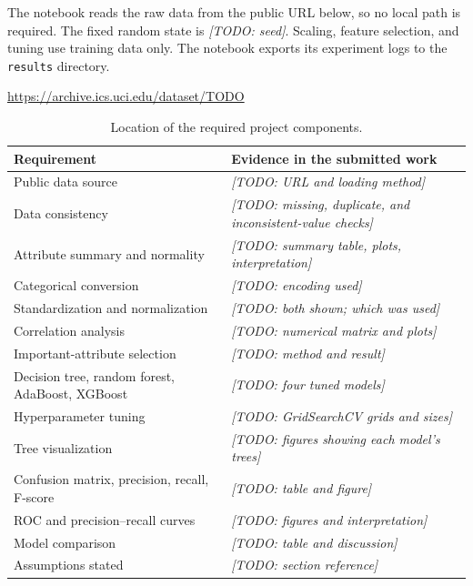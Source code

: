 \documentclass[11pt]{article}
\newcommand{\dataseturl}{https://archive.ics.uci.edu/dataset/TODO}
\DeclareRobustCommand{\todo}[1]{{\color{red}\textit{[TODO: #1]}}}
\begin{document}
The notebook reads the raw data from the public URL below, so no local path is required.
The fixed random state is \todo{seed}. Scaling, feature selection, and tuning use training
data only. The notebook exports its experiment logs to the \texttt{results} directory.

\begin{center}
\small\url{\dataseturl}
\end{center}

\begin{table}[H]
\centering
\caption{Location of the required project components.}
\small
\begin{tabularx}{0.96\textwidth}{lX}
\toprule
Requirement & Evidence in the submitted work \\
\midrule
Public data source & \todo{URL and loading method} \\
Data consistency & \todo{missing, duplicate, and inconsistent-value checks} \\
Attribute summary and normality & \todo{summary table, plots, interpretation} \\
Categorical conversion & \todo{encoding used} \\
Standardization and normalization & \todo{both shown; which was used} \\
Correlation analysis & \todo{numerical matrix and plots} \\
Important-attribute selection & \todo{method and result} \\
Decision tree, random forest, AdaBoost, XGBoost & \todo{four tuned models} \\
Hyperparameter tuning & \todo{GridSearchCV grids and sizes} \\
Tree visualization & \todo{figures showing each model's trees} \\
Confusion matrix, precision, recall, F-score & \todo{table and figure} \\
ROC and precision--recall curves & \todo{figures and interpretation} \\
Model comparison & \todo{table and discussion} \\
Assumptions stated & \todo{section reference} \\
\bottomrule
\end{tabularx}
\end{table}



\end{document}
